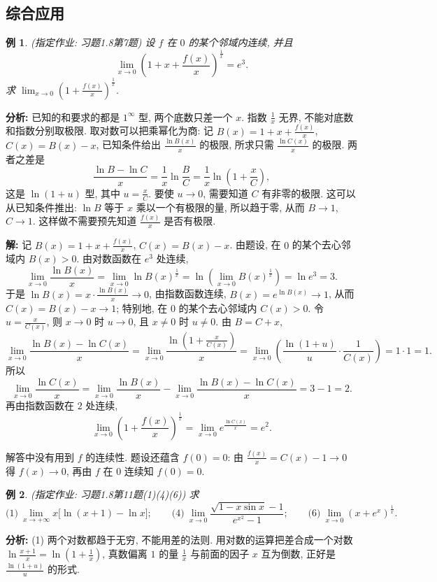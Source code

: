 \documentclass[UTF8,openany]{ctexbook}
\theoremstyle{chinesetextbook}
\newtheorem{example}{例}[section]
\newenvironment{cnsolution}{\par\indent\textbf{解:} \ignorespaces}{\par}
\begin{document}
\subsection{综合应用}
\begin{example}
\textnormal{(指定作业: 习题1.8第7题)} 设 $f$ 在 $0$ 的某个邻域内连续, 并且
\[
\lim_{x\to0}\left(1+x+\frac{f(x)}x\right)^{\frac1x}=e^3.
\]
求 $\displaystyle\lim_{x\to0}\left(1+\frac{f(x)}x\right)^{\frac1x}$.
\end{example}
\par\indent\textbf{分析:} 已知的和要求的都是 $1^\infty$ 型, 两个底数只差一个 $x$. 指数 $\displaystyle\frac1x$ 无界, 不能对底数和指数分别取极限. 取对数可以把乘幂化为商: 记 $\displaystyle B(x)=1+x+\frac{f(x)}x$, $C(x)=B(x)-x$, 已知条件给出 $\displaystyle\frac{\ln B(x)}x$ 的极限, 所求只需 $\displaystyle\frac{\ln C(x)}x$ 的极限. 两者之差是
\[
\frac{\ln B-\ln C}x=\frac1x\ln\frac BC=\frac1x\ln\left(1+\frac xC\right),
\]
这是 $\ln(1+u)$ 型, 其中 $\displaystyle u=\frac xC$. 要使 $u\to0$, 需要知道 $C$ 有非零的极限. 这可以从已知条件推出: $\ln B$ 等于 $x$ 乘以一个有极限的量, 所以趋于零, 从而 $B\to1$, $C\to1$. 这样做不需要预先知道 $\displaystyle\frac{f(x)}x$ 是否有极限.
\begin{cnsolution}
记 $\displaystyle B(x)=1+x+\frac{f(x)}x$, $C(x)=B(x)-x$. 由题设, 在 $0$ 的某个去心邻域内 $B(x)>0$. 由对数函数在 $e^3$ 处连续,
\[
\lim_{x\to0}\frac{\ln B(x)}x=\lim_{x\to0}\ln B(x)^{\frac1x}=\ln\left(\lim_{x\to0}B(x)^{\frac1x}\right)=\ln e^3=3.
\]
于是 $\displaystyle\ln B(x)=x\cdot\frac{\ln B(x)}x\to0$, 由指数函数连续, $B(x)=e^{\ln B(x)}\to1$, 从而 $C(x)=B(x)-x\to1$; 特别地, 在 $0$ 的某个去心邻域内 $C(x)>0$. 令 $\displaystyle u=\frac x{C(x)}$, 则 $x\to0$ 时 $u\to0$, 且 $x\ne0$ 时 $u\ne0$. 由 $B=C+x$,
\[
\lim_{x\to0}\frac{\ln B(x)-\ln C(x)}x=\lim_{x\to0}\frac{\ln\left(1+\frac x{C(x)}\right)}x=\lim_{x\to0}\left(\frac{\ln(1+u)}u\cdot\frac1{C(x)}\right)=1\cdot1=1.
\]
所以
\[
\lim_{x\to0}\frac{\ln C(x)}x=\lim_{x\to0}\frac{\ln B(x)}x-\lim_{x\to0}\frac{\ln B(x)-\ln C(x)}x=3-1=2.
\]
再由指数函数在 $2$ 处连续,
\[
\lim_{x\to0}\left(1+\frac{f(x)}x\right)^{\frac1x}=\lim_{x\to0}e^{\frac{\ln C(x)}x}=e^2.
\]
\end{cnsolution}
解答中没有用到 $f$ 的连续性. 题设还蕴含 $f(0)=0$: 由 $\displaystyle\frac{f(x)}x=C(x)-1\to0$ 得 $f(x)\to0$, 再由 $f$ 在 $0$ 连续知 $f(0)=0$.
\begin{example}
\textnormal{(指定作业: 习题1.8第11题(1)(4)(6))} 求
\[
\text{(1)}\ \lim_{x\to+\infty}x\bigl[\ln(x+1)-\ln x\bigr];\qquad\text{(4)}\ \lim_{x\to0}\frac{\sqrt{1-x\sin x}-1}{e^{x^2}-1};\qquad\text{(6)}\ \lim_{x\to0}\left(x+e^x\right)^{\frac1x}.
\]
\end{example}
\par\indent\textbf{分析:} (1) 两个对数都趋于无穷, 不能用差的法则. 用对数的运算把差合成一个对数 $\displaystyle\ln\frac{x+1}x=\ln\left(1+\frac1x\right)$, 真数偏离 $1$ 的量 $\displaystyle\frac1x$ 与前面的因子 $x$ 互为倒数, 正好是 $\displaystyle\frac{\ln(1+u)}u$ 的形式.
\end{document}
